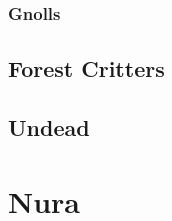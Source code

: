 \documentclass[a4paper,openany]{book}
\begin{document}
\begin{multicols}{2}
\gnome

\gnomishsoldier

\gnomishsoldier

\gnomishillusionist

\subsection{Gnolls}

\gnollhunter

\gnollshaman

\showStdSpells

\gnollshaman

\showStdSpells

\showStdSpells

\end{multicols}

\section{Forest Critters}

\begin{multicols}{2}

\bear

\boar

\chitincrawler

\basilisk

\wolf

\woodspy

\end{multicols}

\section{Undead}

\begin{multicols}{2}

\ghoul

\ghast

\demilich

\lich

\end{multicols}

\chapter{Nura}
\end{document}

